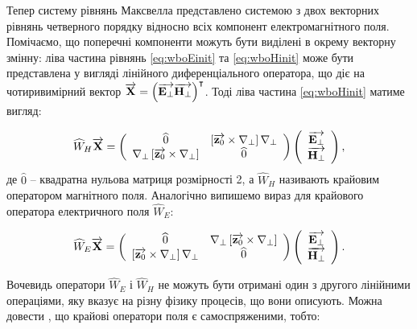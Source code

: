 Тепер систему рівнянь Максвелла представлено системою з двох 
векторних рівнянь 
четверного порядку відносно всіх компонент електромагнітного поля.
Помічаємо, що поперечні компоненти можуть бути виділені в окрему векторну 
змінну: ліва частина рівнянь \eqref{eq:wboEinit} та \eqref{eq:wboHinit} може 
бути представлена у вигляді лінійного диференціального оператора, що діє на
чотиривимірний вектор 
$ \overrightarrow{\mathbf X} = \left( \overrightarrow{\mathbf E_\perp} \overrightarrow{\mathbf H_\perp} \right)^\intercal $. Тоді
ліва частина \eqref{eq:wboHinit} матиме вигляд:

\begin{equation} \label{eq:W_H}
\widehat{W}_H \overrightarrow{\mathbf X} = \left( \begin{array}{cc} \widehat{0} & 
\left[ \overrightarrow{\mathbf z_0} \times \nabla_\perp \right] \nabla_\perp \\
\nabla_\perp \left[ \overrightarrow{\mathbf z_0} \times \nabla_\perp \right] &
\widehat{0} \\ \end{array} \right) \left( \begin{array}{c} 
\overrightarrow{\mathbf E_\perp} \\ \overrightarrow{\mathbf H_\perp} \\ \end{array} \right),
\end{equation}
%
де $ \widehat{0} $ -- квадратна нульова матриця розмірності 2, а 
$ \widehat{W}_H $ називають крайовим оператором магнітного поля. Аналогічно
випишемо вираз для крайового оператора електричного поля $ \widehat{W}_E $:

\begin{equation} \label{eq:W_E}
\widehat{W}_E \overrightarrow{\mathbf X} = \left( \begin{array}{cc} \widehat{0} & 
\nabla_\perp \left[ \overrightarrow{\mathbf z_0} \times \nabla_\perp \right] \\
\left[ \overrightarrow{\mathbf z_0} \times \nabla_\perp \right] \nabla_\perp &
\widehat{0} \\ \end{array} \right) \left( \begin{array}{c} 
\overrightarrow{\mathbf E_\perp} \\ \overrightarrow{\mathbf H_\perp} \\ \end{array} \right).
\end{equation}

Вочевидь оператори $ \widehat{W}_E $ і $ \widehat{W}_H $ не можуть бути 
отримані один з другого лінійними операціями, яку вказує на різну фізику 
процесів, що вони описують. Можна довести 
\cite{imp:Dumin1996, imp:Tretyakov1993}, що крайові оператори поля є 
самоспряженими, тобто:

